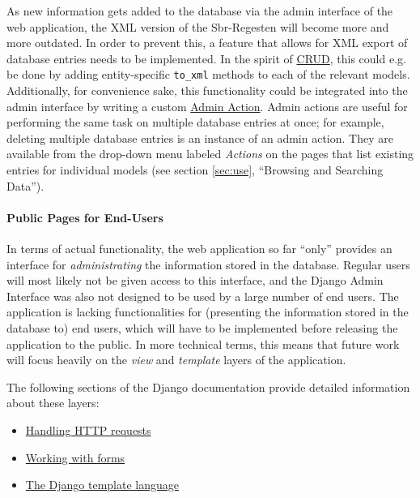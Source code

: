 As new information gets added to the database via the admin interface
of the web application, the XML version of the Sbr-Regesten will
become more and more outdated. In order to prevent this, a feature
that allows for XML export of database entries needs to be
implemented. In the spirit of
\href{https://en.wikipedia.org/wiki/CRUD}{CRUD}, this could e.g. be
done by adding entity-specific \texttt{to\_xml} methods to each of the
relevant models. Additionally, for convenience sake, this
functionality could be integrated into the admin interface by writing
a custom
\href{https://docs.djangoproject.com/en/1.4/ref/contrib/admin/actions/}{Admin
  Action}. Admin actions are useful for performing the same task on
multiple database entries at once; for example, deleting multiple
database entries is an instance of an admin action. They are available
from the drop-down menu labeled \emph{Actions} on the pages that list
existing entries for individual models (see section \ref{sec:use},
``Browsing and Searching Data'').

\paragraph{Public Pages for End-Users}

In terms of actual functionality, the web application so far ``only''
provides an interface for \emph{administrating} the information stored
in the database. Regular users will most likely not be given access to
this interface, and the Django Admin Interface was also not designed
to be used by a large number of end users. The application is lacking
functionalities for (presenting the information stored in the database
to) end users, which will have to be implemented before releasing the
application to the public. In more technical terms, this means that
future work will focus heavily on the \emph{view} and \emph{template}
layers of the application.

The following sections of the Django documentation provide detailed
information about these layers:

\begin{itemize}
\item
  \href{https://docs.djangoproject.com/en/1.4/topics/http/}{Handling
    HTTP requests}
\item
  \href{https://docs.djangoproject.com/en/1.4/topics/forms/}{Working
    with forms}
\item
  \href{https://docs.djangoproject.com/en/1.4/topics/templates/}{The
    Django template language}
\end{itemize}

